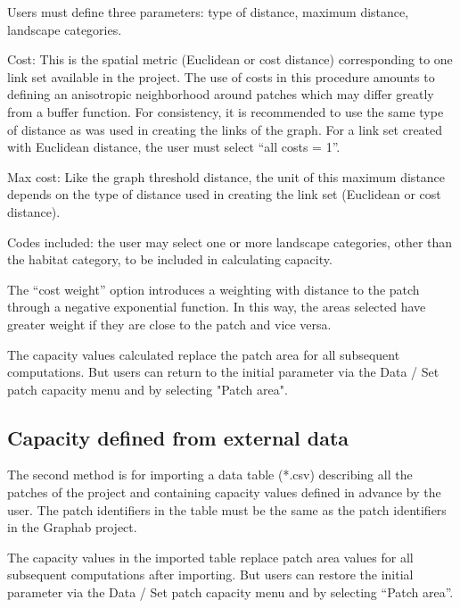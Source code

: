\documentclass{article}
\begin{document}
Users must define three parameters: type of distance, maximum distance, landscape categories.

Cost: This is the spatial metric (Euclidean or cost distance) corresponding to one link set available in the project. The use of costs in this procedure amounts to defining an anisotropic neighborhood around patches which may differ greatly from a buffer function. For consistency, it is recommended to use the same type of distance as was
used in creating the links of the graph. For a link set created with Euclidean distance, the user must select “all costs = 1”.

Max cost: Like the graph threshold distance, the unit of this maximum distance depends on the type of distance used in creating the link set (Euclidean or cost distance).

Codes included: the user may select one or more landscape categories, other than the habitat category, to be included in calculating capacity.

The “cost weight” option introduces a weighting with distance to the patch through a negative exponential function. In this way, the areas selected have greater weight if they are close to the patch and vice versa.

The capacity values calculated replace the patch area for all subsequent computations. But users can return to the initial parameter via the Data / Set patch capacity menu and by selecting "Patch area".

\subsection{Capacity defined from external data}

The second method is for importing a data table (*.csv) describing all the patches of the project and containing capacity values defined in advance by the user. The patch identifiers in the table must be the same as the patch identifiers in the Graphab project.

The capacity values in the imported table replace patch area values for all subsequent computations after importing. But users can restore the initial parameter via the Data / Set patch capacity menu and by selecting “Patch area”.
\end{document}
